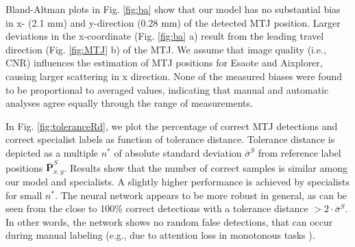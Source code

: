 \documentclass[journal,twoside,web]{ieeecolor}
\begin{document}
Bland-Altman plots in Fig. \ref{fig:ba} show that our model
has no substantial bias in x- (2.1 mm) and y-direction (0.28 mm) of the detected MTJ position. Larger deviations in the x-coordinate (Fig. \ref{fig:ba} a) result from the leading travel direction (Fig. \ref{fig:MTJ} b) of the MTJ. We assume that image quality (i.e., CNR) influences the estimation of MTJ positions for Esaote and Aixplorer, causing larger scattering in x direction. None of the measured biases were found to be proportional to averaged values, indicating that manual and automatic analyses agree equally through the range of measurements.

In Fig. \ref{fig:toleranceRd}, we plot the percentage of correct MTJ detections and correct specialist labels as function of tolerance distance. Tolerance distance is depicted as a multiple $n^{*}$ of absolute standard deviation $\bar{\sigma}^{S}$ from reference label positions $\bar{\boldsymbol{P}}^{S}_{x,y}$. Results show that the number of correct samples is similar among our model and specialists. A slightly higher performance is achieved by specialists for small $n^{*}$. The neural network appears to be more robust in general, as can be seen from the close to 100\% correct detections with a tolerance distance $>2\cdot\bar{\sigma}^{S}$. In other words, the network shows no random false detections, that can occur during manual labeling (e.g., due to attention loss in monotonous tasks \cite{b:Robertson2012}).
\end{document}
